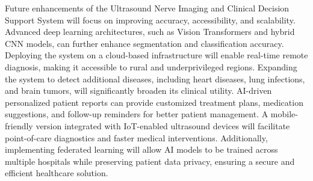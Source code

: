 \documentclass[12pt]{article}
\begin{document}
Future enhancements of the Ultrasound Nerve Imaging and Clinical Decision Support System will focus on improving accuracy, accessibility, and scalability. Advanced deep learning architectures, such as Vision Transformers and hybrid CNN models, can further enhance segmentation and classification accuracy. Deploying the system on a cloud-based infrastructure will enable real-time remote diagnosis, making it accessible to rural and underprivileged regions. Expanding the system to detect additional diseases, including heart diseases, lung infections, and brain tumors, will significantly broaden its clinical utility. AI-driven personalized patient reports can provide customized treatment plans, medication suggestions, and follow-up reminders for better patient management. A mobile-friendly version integrated with IoT-enabled ultrasound devices will facilitate point-of-care diagnostics and faster medical interventions. Additionally, implementing federated learning will allow AI models to be trained across multiple hospitals while preserving patient data privacy, ensuring a secure and efficient healthcare solution.

\vspace{10pt}
\end{document}
